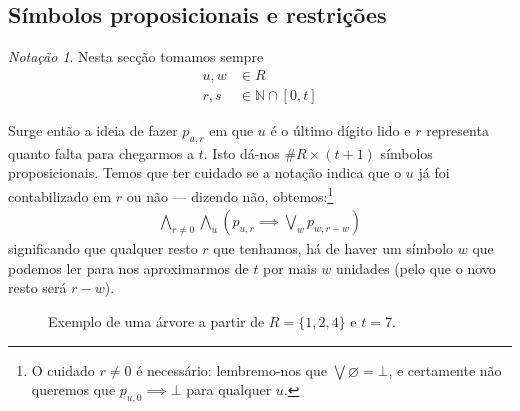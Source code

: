 \documentclass[a4paper,12pt]{article}
\theoremstyle{definition}
\theoremstyle{theorem}
\theoremstyle{remark}
\newtheorem{notç}[defn]{Notação}
\newcommand{\seta}{\draw[-{>[scale=2,width=2]},line width=0.5pt]}
\begin{document}
\subsection{Símbolos proposicionais e restrições}
\begin{notç}
   Nesta secção tomamos sempre
   \begin{align}
      u,w&\in R\\
      r,s&\in \mathbb N\cap[0,t]
   \end{align}
\end{notç}

Surge então a ideia de fazer $p_{u,r}$ em que $u$ é o último dígito lido e
$r$ representa quanto falta para chegarmos a $t$.
Isto dá-nos $\#R\times(t+1)$ símbolos proposicionais.
Temos que ter cuidado se a notação indica que o $u$ já foi contabilizado em $r$
ou não \---- dizendo não, obtemos:\footnote{
   O cuidado $r\neq 0$ é necessário: lembremo-nos que $\bigvee\varnothing=\bot$,
   e certamente não queremos que $p_{u,0}\implies\bot$ para qualquer $u$.
}
\begin{align}
   \bigwedge_{r\neq0}
   \bigwedge_{u}\left( p_{u,r}
   \implies
   \bigvee_{w}p_{w,r-w}
   \right)
\end{align}
significando que qualquer resto $r$ que tenhamos, há de haver um símbolo $w$
que podemos ler para nos aproximarmos de $t$ por mais $w$ unidades (pelo que o
novo resto será $r-w$).


\begin{figure}
   \centering
   \caption{Exemplo de uma árvore a partir de $R=\{1,2,4\}$ e
      $t=7$.}
\end{figure}
\end{document}
